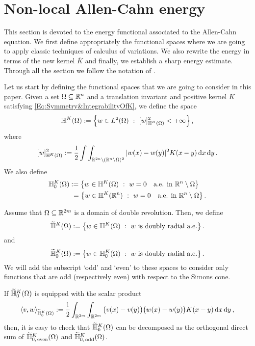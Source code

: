 \section{Non-local Allen-Cahn energy}
\label{Sec:Nonlocal_AllenCahn_Energy}




This section is devoted to the energy functional associated to the Allen-Cahn equation. We first define appropriately the functional spaces where we are going to apply classic techniques of calculus of variations. We also rewrite the energy in terms of the new kernel $\overline{K}$ and finally, we establish a sharp energy estimate. Through all the section we follow the notation of \cite{CozziPassalacqua}.



Let us start by defining the functional spaces that we are going to consider in this paper. Given a set $\Omega \subseteq \mathbb{R}^n$ and a translation invariant and positive kernel $K$ satisfying \eqref{Eq:Symmetry&IntegrabilityOfK}, we define the space
$$
\mathbb{H}^K(\Omega) := \left \{ w \in L^2(\Omega) \ : \ [w]^2_{\mathbb{H}^K(\Omega)} < + \infty \right \},
$$
where
$$
[w]^2_{\mathbb{H}^K(\Omega)} := \dfrac{1}{2}\int\int_{\mathbb{R}^{2n} \setminus (\mathbb{R}^n\setminus\Omega)^2} |w(x) - w(y)|^2 K(x-y) \,\mathrm{d} x \,\mathrm{d} y\,.
$$
We also define
\begin{align*}
	\mathbb{H}^K_0(\Omega) &:= \left \{ w \in \mathbb{H}^K(\Omega) \ : \  w = 0 \quad \textrm{a.e. in } \mathbb{R}^n \setminus \Omega \right \} \\
	&\ = \left \{ w \in \mathbb{H}^K(\mathbb{R}^n) \ : \  w = 0 \quad \textrm{a.e. in } \mathbb{R}^n \setminus \Omega \right \}.
\end{align*}

Assume that $\Omega \subseteq \mathbb{R}^{2m}$ is a domain of double revolution. Then, we define
$$
\widetilde{\mathbb{H}}^K(\Omega) := \left \{ w \in \mathbb{H}^K(\Omega) \ : \ w \textrm{ is doubly radial a.e.} \right \}.
$$
and
$$
\widetilde{\mathbb{H}}^K_0(\Omega) := \left \{ w \in \mathbb{H}^K_0(\Omega) \ : \ w \textrm{ is doubly radial a.e.} \right \}.
$$
We will add the subscript `odd' and `even' to these spaces to consider only functions that are odd (respectively even) with respect to the Simons cone.


\begin{remark}
\label{Remark:DecompositionHK}
If $\widetilde{\mathbb{H}}^K_0(\Omega)$ is equipped with the scalar product
$$
\langle v,w \rangle_{\widetilde{\mathbb{H}}^K_0(\Omega)} := \dfrac{1}{2}\int_{\mathbb{R}^{2m}} \int_{\mathbb{R}^{2m}}  \big(v(x) - v(y)\big)\big(w(x) - w(y)\big) K(x-y) \,\mathrm{d} x \,\mathrm{d} y\,,
$$
then, it is easy to check that $\widetilde{\mathbb{H}}^K_0(\Omega)$ can be decomposed as the orthogonal
direct sum of $\widetilde{\mathbb{H}}^K_{0,\, \mathrm{even}}(\Omega)$ and $\widetilde{\mathbb{H}}^K_{0,\,
\mathrm{odd}}(\Omega)$.
\end{remark}

